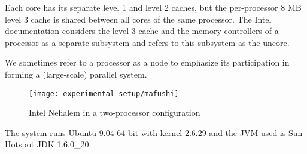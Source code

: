 Each core has its separate level 1 and level 2 caches, but the
per-processor 8 MB level 3 cache is shared between all cores of the
same processor. The Intel documentation considers the level 3 cache
and the memory controllers of a processor as a separate subsystem and
refers to this subsystem as the uncore. 

We sometimes refer to a processor as a node to emphasize its
participation in forming a (large-scale) parallel system.

\begin{figure}[htb]
  \centering
  \texttt{[image: experimental-setup/mafushi]}
  \caption[Intel Nehalem in a two-processor configuration]{Intel
    Nehalem in a two-processor configuration}
  \label{fig:experimental-setup-mafushi}
\end{figure}

The system runs Ubuntu 9.04 64-bit with kernel 2.6.29 and the JVM used
is Sun Hotspot JDK 1.6.0\_20.


